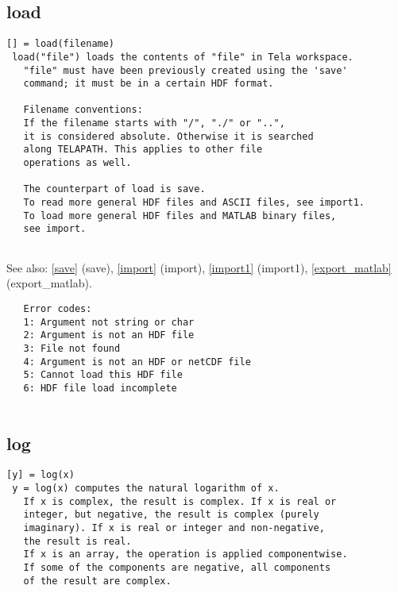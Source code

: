 \documentclass[a4paper]{article}
\begin{document}
\subsection{load\label{load}}

\begin{tscreen}
\begin{verbatim}
[] = load(filename)
 load("file") loads the contents of "file" in Tela workspace.
   "file" must have been previously created using the 'save'
   command; it must be in a certain HDF format.
   
   Filename conventions:
   If the filename starts with "/", "./" or "..",
   it is considered absolute. Otherwise it is searched
   along TELAPATH. This applies to other file
   operations as well.
   
   The counterpart of load is save.
   To read more general HDF files and ASCII files, see import1.
   To load more general HDF files and MATLAB binary files,
   see import.
   
\end{verbatim}

See also: \ref{save} {(save)}, \ref{import} {(import)}, \ref{import1} {(import1)}, \ref{export_matlab} {(export\_matlab)}.
\begin{verbatim}
   Error codes:
   1: Argument not string or char
   2: Argument is not an HDF file
   3: File not found
   4: Argument is not an HDF or netCDF file
   5: Cannot load this HDF file
   6: HDF file load incomplete
   
\end{verbatim}
\end{tscreen}





\subsection{log\label{log}}

\begin{tscreen}
\begin{verbatim}
[y] = log(x)
 y = log(x) computes the natural logarithm of x.
   If x is complex, the result is complex. If x is real or
   integer, but negative, the result is complex (purely
   imaginary). If x is real or integer and non-negative,
   the result is real.
   If x is an array, the operation is applied componentwise.
   If some of the components are negative, all components
   of the result are complex. 
\end{verbatim}
\end{tscreen}
\end{document}
